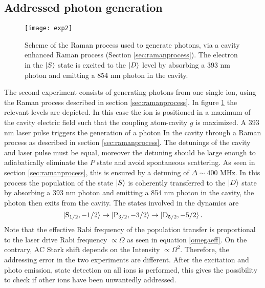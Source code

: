 \subsection{Addressed photon generation}
\label{sec:expphoton}
\begin{figure}
\centering
\texttt{[image: exp2]}
\caption{Scheme of the Raman process used to generate photons, via a cavity enhanced Raman process (Section \ref{sec:ramanprocess}). The electron in the $\ket{S}$ state is excited to the $\ket{D}$ level by absorbing a 393 nm photon and emitting a 854 nm photon in the cavity.}
\label{img:sec2}
\end{figure}
The second experiment consists of generating photons from one single ion, using the Raman process described in section \ref{sec:ramanprocess}. In figure \ref{img:sec2} the relevant levels are depicted. In this case the ion is positioned in a maximum of the cavity electric field such that the coupling atom-cavity $g$ is maximized. A 393 nm laser pulse triggers the generation of a photon In the cavity through a Raman process as described in section \ref{sec:ramanprocess}. The detunings of the cavity and laser pulse must be equal, moreover the detuning should be large enough to adiabatically eliminate the $P$ state and avoid spontaneous scattering. As seen in section \ref{sec:ramanprocess}, this is ensured by a detuning of $\Delta \sim 400$ MHz.
In this process the population of the state $\ket{S}$ is coherently transferred to the $\ket{D}$ state by absorbing a 393 nm photon and emitting a 854 nm photon in the cavity, the photon then exits from the cavity. The states involved in the dynamics are
\begin{equation}
\ket{\text{S}_{1/2},-1/2} \to \ket{\text{P}_{3/2},-3/2} \to \ket{\text{D}_{5/2},-5/2}.
\end{equation}
Note that the effective Rabi frequency of the population transfer is proportional to the laser drive Rabi frequency $\propto \Omega$ as seen in equation \eqref{omegaeff}. On the contrary, AC Stark shift depends on the Intensity $\propto \Omega^2$. Therefore, the addressing error in the two experiments are different. After the excitation and photo emission, state detection on all ions is performed, this gives the possibility to check if other ions have been unwantedly addressed.

